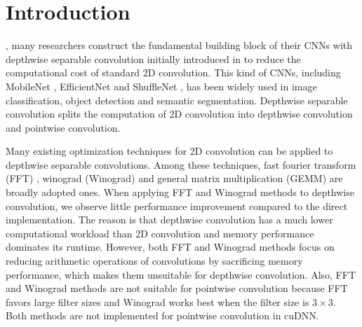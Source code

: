 \section{Introduction}
, many researchers construct the fundamental building block of their CNNs with depthwise separable convolution initially introduced in \cite{sifre2014rigid} to reduce the computational cost of standard 2D convolution. 
This kind of CNNs, including MobileNet \cite{Sandler_2018_CVPR,howard2019searching}, EfficientNet \cite{tan2019efficientnet} and ShuffleNet \cite{Ma_2018_ECCV}, has been widely used in image classification, object detection and  semantic segmentation.
Depthwise separable convolution splits the computation of 2D convolution into depthwise convolution and pointwise convolution. 

Many existing optimization techniques \cite{li2016optimizing,Zhen2018Optimizing,enfedaque2014implementation,liu2019optimizing,winter2019adaptive,vasilache2014fast,lavin2016fast,Vasudevan2017Parallel,Chellapilla2006High} for 2D convolution can be applied to depthwise separable convolutions. 
Among these techniques, fast fourier transform (FFT) \cite{vasilache2014fast}, winograd (Winograd) \cite{lavin2016fast} and general matrix multiplication (GEMM) \cite{Vasudevan2017Parallel,Chellapilla2006High} are broadly adopted ones.
When applying FFT and Winograd methods to depthwise convolution, we observe little performance improvement compared to the direct implementation. 
The reason is that depthwise convolution has a much lower computational workload than 2D convolution and memory performance dominates its runtime. 
However, both FFT and Winograd methods focus on reducing arithmetic operations of convolutions by sacrificing memory performance, which makes them unsuitable for depthwise convolution.
Also, FFT and Winograd methods are not suitable for pointwise convolution because FFT favors large filter sizes and Winograd works best when the filter size is $3 \times 3$. Both methods are not implemented for pointwise convolution in cuDNN.

